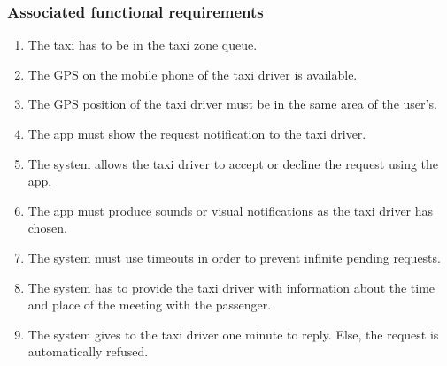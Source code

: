 \subsubsection{Associated functional requirements}
\begin{enumerate}
\item The taxi has to be in the taxi zone queue.
\item The GPS on the mobile phone of the taxi driver is available.
\item The GPS position of the taxi driver must be in the same area of the user's.
\item The app must show the request notification to the taxi driver.
\item The system allows the taxi driver to accept or decline the request using the app.
\item The app must produce sounds or visual notifications as the taxi driver has chosen.
\item The system must use timeouts in order to prevent infinite pending requests.
\item The system has to provide the taxi driver with information about the time and place of the meeting with the passenger.
\item The system gives to the taxi driver one minute to reply. Else, the request is automatically refused.
\end{enumerate}
